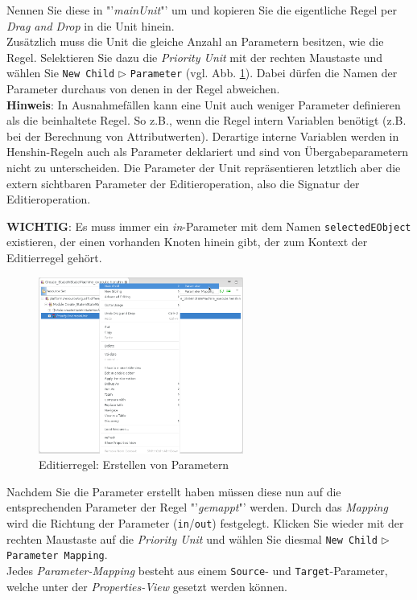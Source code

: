 Nennen Sie diese in "'\textit{mainUnit}"' um und kopieren Sie die eigentliche Regel per \textit{Drag and Drop} in die Unit hinein.\\
Zusätzlich muss die Unit die gleiche Anzahl an Parametern besitzen, wie die Regel. 
Selektieren Sie dazu die \textit{Priority Unit} mit der rechten Maustaste und wählen Sie \texttt{New Child} $\triangleright$ \texttt{Parameter} (vgl. Abb. \ref{silift-editrule_unit_create_parameter}). 
Dabei dürfen die Namen der Parameter durchaus von denen in der Regel abweichen.\\

\textbf{Hinweis}: In Ausnahmefällen kann eine Unit auch weniger Parameter definieren als die beinhaltete Regel. So z.B., wenn die Regel intern Variablen benötigt (z.B. bei der Berechnung von Attributwerten). Derartige interne Variablen werden in Henshin-Regeln auch als Parameter deklariert und sind von Übergabeparametern nicht zu unterscheiden. Die Parameter der Unit repräsentieren letztlich aber die extern sichtbaren Parameter der Editieroperation, also die Signatur der Editieroperation.

\textbf{WICHTIG}: Es muss immer ein \textit{in}-Parameter mit dem Namen \texttt{selectedEObject} existieren, der einen vorhanden Knoten hinein gibt, der zum Kontext der Editierregel gehört.


\begin{figure}[H]
\centering
\includegraphics[width=0.6\textwidth]{editrules/graphics/silift-editrule_unit_create_parameter.png}
\caption{Editierregel: Erstellen von Parametern}
\label{silift-editrule_unit_create_parameter}
\end{figure}

Nachdem Sie die Parameter erstellt haben müssen diese nun auf die entsprechenden Parameter der Regel "'\textit{gemappt}"' werden.
Durch das \textit{Mapping} wird die Richtung der Parameter (\texttt{in}/\texttt{out}) festgelegt.
Klicken Sie wieder mit der rechten Maustaste auf die \textit{Priority Unit} und wählen Sie diesmal \texttt{New Child} $\triangleright$ \texttt{Parameter Mapping}.\\
Jedes \textit{Parameter-Mapping} besteht aus einem \texttt{Source}- und \texttt{Target}-Parameter, welche unter der \textit{Properties-View} gesetzt werden können.\\

